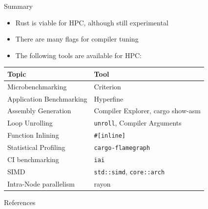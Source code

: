 \documentclass[compress,aspectratio=169]{beamer}
\begin{document}
\begin{frame}{Summary}
\label{pg:lastpage} %
  \begin{itemize}
    \item Rust is viable for HPC, although still experimental
      \pause
    \item There are many flags for compiler tuning
      \pause
    \item The following tools are available for HPC:
      \pause
  \end{itemize}
  \begin{table}[h]
\centering
    \begin{tabular}{|l|l|}
      \hline
      \textbf{Topic} & \textbf{Tool}\\
      \hline
      Microbenchmarking & Criterion\\
      \hline
      Application Benchmarking & Hyperfine\\
      \hline
      Assembly Generation & Compiler Explorer, cargo show-asm\\
      \hline
      Loop Unrolling & \texttt{unroll}, Compiler Arguments\\
      \hline
      Function Inlining & \texttt{\#[inline]} \\
      \hline
      Statistical Profiling & \texttt{cargo-flamegraph} \\
      \hline
      CI benchmarking & \texttt{iai} \\
      \hline
      SIMD & \texttt{std::simd}, \texttt{core::arch} \\
      \hline
      Intra-Node parallelism & rayon \\
      \hline
    \end{tabular}
  \end{table}
\end{frame}

\begin{frame}[allowframebreaks]{References}
\renewcommand*{\bibfont}{\normalfont\scriptsize}
\printbibliography
\end{frame}
\end{document}
